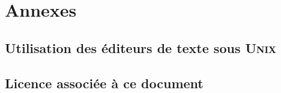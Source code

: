 \documentclass[titlepage,twoside,a4paper]{book}
\newcounter{remarque-cnt}
\newcounter{example-cnt}
\newcommand{\Unix}{\textsc{Unix}}
\newcommand{\myparttitle}{}
\newcommand{\mypart}[1]{
	{
		\pagestyle{empty}
		\part{#1}
	}
	\renewcommand{\myparttitle}{#1 -- }
}
\begin{document}
\mypart{Annexes}
\begin{appendix}




\setcounter{remarque-cnt}{1}
\setcounter{example-cnt}{1}
\chapter{Utilisation des {\'e}diteurs de texte sous {\Unix}}




\chapter{Licence associ{\'e}e {\`a} ce document}



\clearpage
\newpage
\renewcommand{\myparttitle}{\bibname -- }

\end{appendix}

\clearpage
\lhead[Conventions]{}
\chead{}

\clearpage						%

\clearpage
\newpage
\printindex
\renewcommand{\myparttitle}{}

\clearpage
\lhead[\listfigurename]{}
\chead{}
\rhead[]{\listfigurename}

\listoffigures

\clearpage
\lhead[\listtablename]{}
\chead{}
\rhead[]{\listtablename}

\listoftables

%
%
\end{document}
